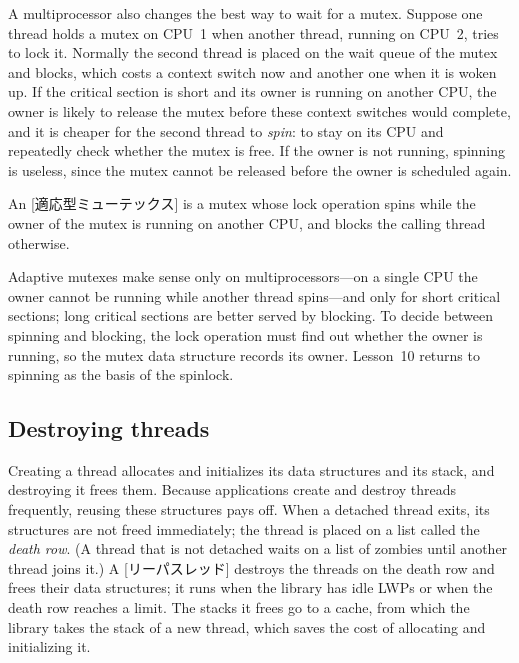 \documentclass[../main.tex]{subfiles}
\begin{document}
A multiprocessor also changes the best way to wait for a mutex.  Suppose
one thread holds a mutex on CPU~1 when another thread, running on CPU~2,
tries to lock it.  Normally the second thread is placed on the wait queue
of the mutex and blocks, which costs a context switch now and another one
when it is woken up.  If the
critical section is short and its owner is running on another CPU, the
owner is likely to release the mutex before these context switches would
complete, and it is cheaper for the second thread to \emph{spin}: to stay
on its CPU and repeatedly check whether the mutex is free.  If the owner is not running,
spinning is useless, since the mutex cannot be released before the owner
is scheduled again.

\begin{definition}
  An [適応型ミューテックス] is a mutex whose lock
  operation spins while the owner of the mutex is running on another CPU,
  and blocks the calling thread otherwise.
\end{definition}

Adaptive mutexes make sense only on multiprocessors---on a single CPU the
owner cannot be running while another thread spins---and only for short
critical sections; long critical sections are better served by blocking.
To decide between spinning and blocking, the lock operation must find out
whether the owner is running, so the mutex data structure records its
owner.  Lesson~10 returns to spinning as the basis of the
spinlock.

\subsection{Destroying threads}

Creating a thread allocates and initializes its data structures and its
stack, and destroying it frees them.  Because applications create and
destroy threads frequently, reusing these structures pays off.  When a
detached thread exits, its structures are not freed immediately; the
thread is placed on a list called the \emph{death row}.  (A thread that is
not detached waits on a list of zombies until another thread joins it.)  A
[リーパスレッド] destroys the threads on the death row
and frees their data structures; it runs when the library has idle LWPs or
when the death row reaches a limit.  The stacks it frees go to a cache,
from which the library takes the stack of a new thread, which saves the
cost of allocating and initializing it.
\end{document}
